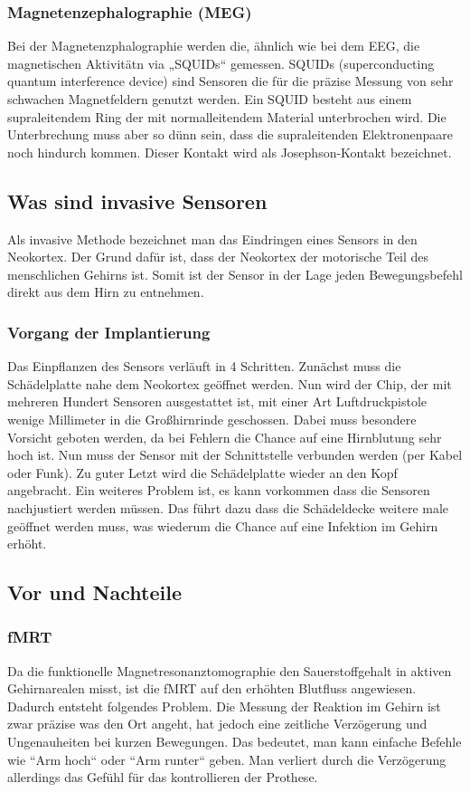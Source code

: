 \documentclass[11pt,ngerman,parskip=half]{scrartcl}
\begin{document}
\subsubsection{Magnetenzephalographie (MEG)}
Bei der Magnetenzphalographie werden die, ähnlich wie bei dem EEG, die magnetischen Aktivitätn via „SQUIDs“ gemessen. SQUIDs (superconducting quantum interference device) sind Sensoren die für die präzise Messung von sehr schwachen Magnetfeldern genutzt werden. Ein SQUID besteht aus einem supraleitendem Ring der mit normalleitendem Material unterbrochen wird. Die Unterbrechung muss aber so dünn sein, dass die supraleitenden Elektronenpaare noch hindurch kommen. Dieser Kontakt wird als Josephson-Kontakt bezeichnet.
\parencite{meg}
\subsection{Was sind invasive Sensoren}
Als invasive Methode bezeichnet man das Eindringen eines Sensors in den Neokortex. Der Grund dafür ist, dass der Neokortex der motorische Teil des menschlichen Gehirns ist. Somit ist der Sensor in der Lage jeden Bewegungsbefehl direkt aus dem Hirn zu entnehmen.
\parencite{bciuinvasiv,methoden}
\subsubsection{Vorgang der Implantierung}
Das Einpflanzen des Sensors verläuft in 4 Schritten. Zunächst muss die Schädelplatte nahe dem Neokortex geöffnet werden. Nun wird der Chip, der mit mehreren Hundert Sensoren ausgestattet ist, mit einer Art Luftdruckpistole wenige Millimeter in die Großhirnrinde geschossen. Dabei muss besondere Vorsicht geboten werden, da bei Fehlern die Chance auf eine Hirnblutung sehr hoch ist. Nun muss der Sensor mit der Schnittstelle verbunden werden (per Kabel oder Funk). Zu guter Letzt wird die Schädelplatte wieder an den Kopf angebracht. Ein weiteres Problem ist, es kann vorkommen dass die Sensoren nachjustiert werden müssen. Das führt dazu dass die Schädeldecke weitere male geöffnet werden muss, was wiederum die Chance auf eine Infektion im Gehirn erhöht.\cite{bciuinvasiv}
\subsection{Vor und Nachteile}  
\subsubsection{fMRT}
Da die funktionelle Magnetresonanztomographie den Sauerstoffgehalt in aktiven Gehirnarealen misst, ist die fMRT auf den erhöhten Blutfluss angewiesen. Dadurch entsteht folgendes Problem. Die Messung der Reaktion im Gehirn ist zwar präzise was den Ort angeht, hat jedoch eine zeitliche Verzögerung und Ungenauheiten bei kurzen Bewegungen. Das bedeutet, man kann einfache Befehle wie “Arm hoch“ oder “Arm runter“ geben. Man verliert durch die Verzögerung allerdings das Gefühl für das kontrollieren der Prothese.
\end{document}
